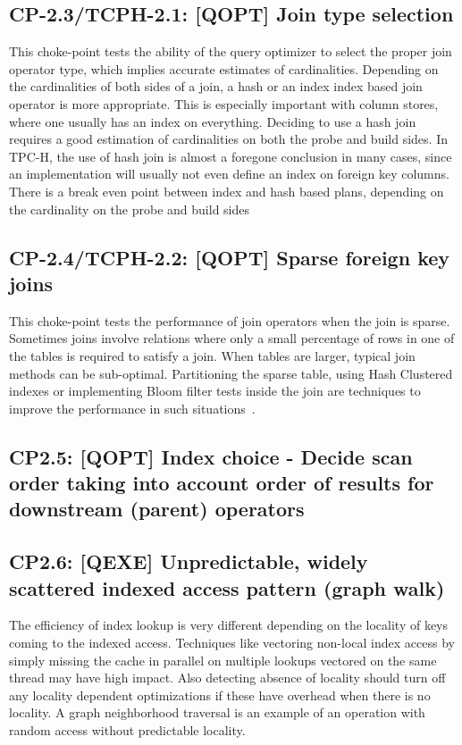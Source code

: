 \subsection*{CP-2.3/TCPH-2.1: [QOPT]  Join type selection}
\label{choke_point_2.3}
This choke-point tests the ability of the query optimizer to select the proper join operator type, which implies accurate estimates of cardinalities.
Depending on the cardinalities of both sides of a join, a hash or an index index based join operator is more appropriate.
This is especially important with column stores, where one usually has an index on everything. Deciding to use a hash join requires a good estimation of cardinalities on both the probe and build sides.
In TPC-H, the use of hash join is almost a foregone conclusion in many cases, since an implementation will usually not even define an index on foreign key columns.
There is a break even point between index and hash based plans, depending on the cardinality on the probe and build sides



\subsection*{CP-2.4/TCPH-2.2: [QOPT]  Sparse foreign key joins}
\label{choke_point_2.4}
This choke-point tests the performance of join operators when the join is sparse. Sometimes joins involve relations where only a small percentage of rows in one of the tables is required to satisfy a join. When tables are larger, typical join methods can be sub-optimal. Partitioning the sparse table, using Hash Clustered indexes or implementing Bloom filter tests inside the join are techniques to improve the performance in such situations~\cite{DBLP:journals/csur/Graefe93}.



\subsection*{CP2.5: [QOPT] Index choice - Decide scan order taking into account order of results for downstream (parent) operators}
\label{choke_point_2.5}


%

\subsection*{CP2.6: [QEXE] Unpredictable, widely scattered indexed access pattern (graph walk)}
\label{choke_point_2.6}
The efficiency of index lookup is very different depending on the locality of keys coming to the indexed access. Techniques like vectoring non-local index access by simply missing the cache in parallel on multiple lookups vectored on the same thread may have high impact. Also detecting absence of locality should turn off any locality dependent optimizations if these have overhead when there is no locality. A graph neighborhood traversal is an example of an operation with random access without predictable locality.

